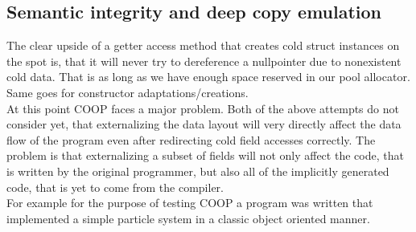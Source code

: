 \subsection{Semantic integrity and deep copy emulation}
The clear upside of a getter access method that creates cold struct instances on the spot is, that it will never try to dereference a nullpointer due to nonexistent cold data. That is as long as we have enough space reserved in our pool allocator. Same goes for constructor adaptations/creations.\\
At this point COOP faces a major problem. Both of the above attempts do not consider yet, that externalizing the data layout will very directly affect the data flow of the program even after redirecting cold field accesses correctly. The problem is that externalizing a subset of fields will not only affect the code, that is written by the original programmer, but also all of the implicitly generated code, that is yet to come from the compiler.\\
For example for the purpose of testing COOP a program was written that implemented a simple particle system in a classic object oriented manner.
